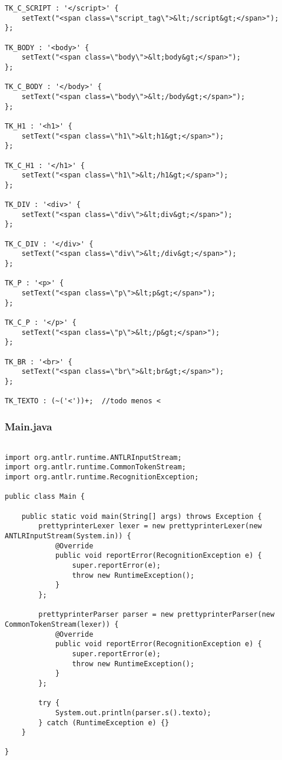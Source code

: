 {\begin{verbatim}
TK_C_SCRIPT : '</script>' {
    setText("<span class=\"script_tag\">&lt;/script&gt;</span>");
};

TK_BODY : '<body>' {
    setText("<span class=\"body\">&lt;body&gt;</span>");
};

TK_C_BODY : '</body>' {
    setText("<span class=\"body\">&lt;/body&gt;</span>");
};

TK_H1 : '<h1>' {
    setText("<span class=\"h1\">&lt;h1&gt;</span>");
};

TK_C_H1 : '</h1>' {
    setText("<span class=\"h1\">&lt;/h1&gt;</span>");
};

TK_DIV : '<div>' {
    setText("<span class=\"div\">&lt;div&gt;</span>");
};

TK_C_DIV : '</div>' {
    setText("<span class=\"div\">&lt;/div&gt;</span>");
};

TK_P : '<p>' {
    setText("<span class=\"p\">&lt;p&gt;</span>");
};

TK_C_P : '</p>' {
    setText("<span class=\"p\">&lt;/p&gt;</span>");
};

TK_BR : '<br>' {
    setText("<span class=\"br\">&lt;br&gt;</span>");
};

TK_TEXTO : (~('<'))+;  //todo menos <

\end{verbatim}
}

\newpage

\subsubsection{Main.java}
\texttt{}


{\scriptsize
\begin{verbatim}

import org.antlr.runtime.ANTLRInputStream;
import org.antlr.runtime.CommonTokenStream;
import org.antlr.runtime.RecognitionException;

public class Main {    
    
    public static void main(String[] args) throws Exception {
        prettyprinterLexer lexer = new prettyprinterLexer(new ANTLRInputStream(System.in)) {
            @Override
            public void reportError(RecognitionException e) {
                super.reportError(e);
                throw new RuntimeException();
            }
        };
        
        prettyprinterParser parser = new prettyprinterParser(new CommonTokenStream(lexer)) {
            @Override
            public void reportError(RecognitionException e) {
                super.reportError(e);
                throw new RuntimeException();
            }
        };
        
        try {
            System.out.println(parser.s().texto);
        } catch (RuntimeException e) {}
    }
    
}


\end{verbatim}
}

